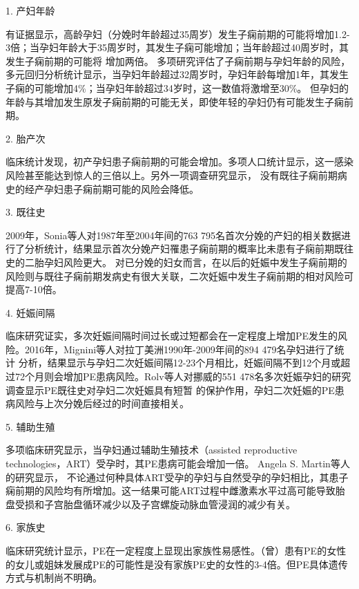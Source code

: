 1. 产妇年龄

有证据显示，高龄孕妇（分娩时年龄超过35周岁）发生子痫前期的可能将增加1.2-3倍；当孕妇年龄大于35周岁时，其发生子痫可能增加；当年龄超过40周岁时，其发生子痫前期的可能将
增加两倍\cite{Duckitt2005,FIGO,Yogev2010}。
多项研究评估了子痫前期与孕妇年龄的风险，多元回归分析统计显示，当孕妇年龄超过32周岁时，孕妇年龄每增加1年，其发生子痫的可能增加4\%；当孕妇年龄超过34岁时，这一数值将激增至30\%。
但孕妇的年龄与其增加发生原发子痫前期的可能无关，即使年轻的孕妇仍有可能发生子痫前期\cite{Duckitt2005,Poon2010}。

2. 胎产次

临床统计发现，初产孕妇患子痫前期的可能会增加。多项人口统计显示，这一感染风险甚至能达到惊人的三倍以上\cite{Lee2000,Duckitt2005,Coonrod1995}。另外一项调查研究显示，
没有既往子痫前期病史的经产孕妇患子痫前期可能的风险会降低\cite{Robillard1993}。

3. 既往史

2009年，Sonia等人对1987年至2004年间的763 795名首次分娩的产妇的相关数据进行了分析统计，结果显示首次分娩产妇罹患子痫前期的概率比未患有子痫前期既往史的二胎孕妇风险更大\cite{Sonia2009}。
对已分娩的妇女而言，在以后的妊娠中发生子痫前期的风险则与既往子痫前期发病史有很大关联，二次妊娠中发生子痫前期的相对风险可提高7-10倍\cite{Duckitt2005,CAMPBELL1985,Lie1998,Sibai1986}。

4. 妊娠间隔

临床研究证实，多次妊娠间隔时间过长或过短都会在一定程度上增加PE发生的风险\cite{Rousso2002,Duckitt2005,Conde2007}。2016年，Mignini等人\cite{Mignini2016}对拉丁美洲1990年-2009年间的894 479名孕妇进行了统计
分析，结果显示与孕妇二次妊娠间隔12-23个月相比，妊娠间隔不到12个月或超过72个月则会增加PE患病风险。Rolv\cite{Rolv2002}等人对挪威的551 478名多次妊娠孕妇的研究调查显示PE既往史对孕妇二次妊娠具有短暂
的保护作用，孕妇二次妊娠的PE患病风险与上次分娩后经过的时间直接相关。

5. 辅助生殖

多项临床研究显示，当孕妇通过辅助生殖技术（assisted reproductive technologies，ART）受孕时，其PE患病可能会增加一倍\cite{Jackson2004,Trogstad2009}。 Angela S. Martin等人\cite{Martin2016}的研究显示，
不论通过何种具体ART受孕的孕妇与自然受孕的孕妇相比，其患子痫前期的风险均有所增加。这一结果可能ART过程中雌激素水平过高可能导致胎盘受损和子宫胎盘循环减少以及子宫螺旋动脉血管浸润的减少有关。

6. 家族史

临床研究统计显示，PE在一定程度上显现出家族性易感性\cite{ARNGRIMSSON1990,OAG9,Williams2011}。（曾）患有PE的女性的女儿或姐妹发展成PE的可能性是没有家族PE史的女性的3-4倍\cite{ARNGRIMSSON1990,Cincotta1998,FIGO,Williams2011}。但PE具体遗传方式与机制尚不明确。

